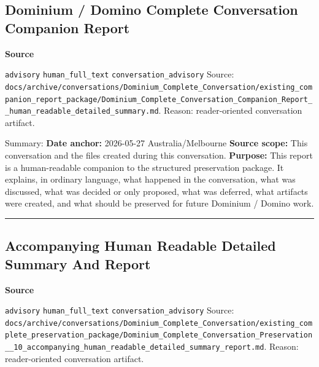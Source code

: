\documentclass[9pt,a4paper,openany]{book}
\newcommand{\vonecallout}[3]{\par\medskip\noindent\begingroup\setlength{\fboxsep}{7pt}\colorbox{DomCalloutBg}{\parbox{0.94\linewidth}{\textbf{\textcolor{#1}{#2}}\par #3}}\endgroup\par\medskip}
\begin{document}
\subsection{Dominium / Domino Complete Conversation Companion Report}

\vonecallout{DomSlate}{Source}{\texttt{advisory} \texttt{human\_\allowbreak{}full\_\allowbreak{}text} \texttt{conversation\_\allowbreak{}advisory} Source: \texttt{docs/\allowbreak{}archive/\allowbreak{}conversations/\allowbreak{}Dominium\_\allowbreak{}Complete\_\allowbreak{}Conversation/\allowbreak{}existing\_\allowbreak{}companion\_\allowbreak{}report\_\allowbreak{}package/\allowbreak{}Dominium\_\allowbreak{}Complete\_\allowbreak{}Conversation\_\allowbreak{}Companion\_\allowbreak{}Report\_\allowbreak{}\_\allowbreak{}human\_\allowbreak{}readable\_\allowbreak{}detailed\_\allowbreak{}summary.\allowbreak{}md}.\allowbreak{} Reason: reader-\allowbreak{}oriented conversation artifact.\allowbreak{}}

Summary: \textbf{Date anchor:} 2026-\allowbreak{}05-\allowbreak{}27 Australia/\allowbreak{}Melbourne \textbf{Source scope:} This conversation and the files created during this conversation.\allowbreak{} \textbf{Purpose:} This report is a human-\allowbreak{}readable companion to the structured preservation package.\allowbreak{} It explains, in ordinary language, what happened in the conversation, what was discussed, what was decided or only proposed, what was deferred, what artifacts were created, and what should be preserved for future Dominium /\allowbreak{} Domino work.\allowbreak{}


\par\medskip\hrule\medskip


\subsection{Accompanying Human Readable Detailed Summary And Report}

\vonecallout{DomSlate}{Source}{\texttt{advisory} \texttt{human\_\allowbreak{}full\_\allowbreak{}text} \texttt{conversation\_\allowbreak{}advisory} Source: \texttt{docs/\allowbreak{}archive/\allowbreak{}conversations/\allowbreak{}Dominium\_\allowbreak{}Complete\_\allowbreak{}Conversation/\allowbreak{}existing\_\allowbreak{}complete\_\allowbreak{}preservation\_\allowbreak{}package/\allowbreak{}Dominium\_\allowbreak{}Complete\_\allowbreak{}Conversation\_\allowbreak{}Preservation\_\allowbreak{}\_\allowbreak{}10\_\allowbreak{}accompanying\_\allowbreak{}human\_\allowbreak{}readable\_\allowbreak{}detailed\_\allowbreak{}summary\_\allowbreak{}report.\allowbreak{}md}.\allowbreak{} Reason: reader-\allowbreak{}oriented conversation artifact.\allowbreak{}}
\end{document}
